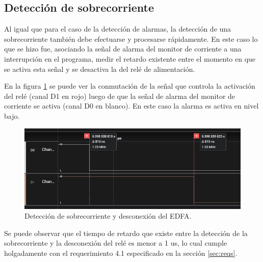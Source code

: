\subsection{Detección de sobrecorriente}

Al igual que para el caso de la detección de alarmas, la detección de una sobrecorriente también debe efectuarse y procesarse rápidamente. En este caso lo que se hizo fue, asociando la señal de alarma del monitor de corriente a una interrupción en el programa, medir el retardo existente entre el momento en que se activa esta señal y se desactiva la del relé de alimentación.

En la figura \ref{fig:detecOC} se puede ver la conmutación de la señal que controla la activación del relé (canal D1 en rojo) luego de que la señal de alarma del monitor de corriente se activa (canal D0 en blanco). En este caso la alarma es activa en nivel bajo.

\begin{figure}[H]
\centering
\includegraphics[width=1\textwidth]{./Figures/detecOC.png}
\caption{Detección de sobrecorriente y desconexión del EDFA.}
\label{fig:detecOC}
\end{figure}

Se puede observar que el tiempo de retardo que existe entre la detección de la sobrecorriente y la desconexión del relé es menor a 1 us, lo cual cumple holgadamente con el requerimiento 4.1 especificado en la sección \ref{sec:reqs}.